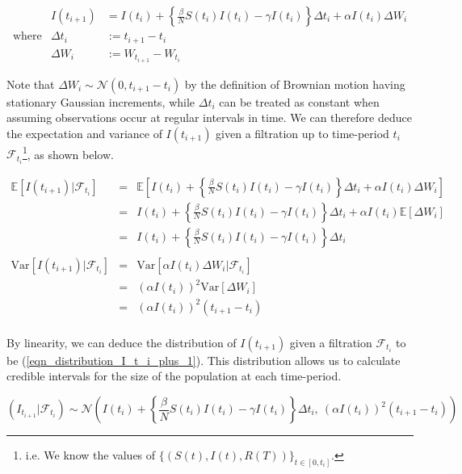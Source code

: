 \documentclass[11pt,a4paper]{article}
\newcommand*{\expect}{\mathbb{E}}
\newcommand*{\var}{\text{Var}}
\theoremstyle{break}
\begin{document}
  \begin{equation}\label{eqn_approximate_numerical_stochastic_I}
    \begin{array}{rrl}
      &I(t_{i+1})&=I(t_i)+\left\{\frac{\beta}N S(t_i)I(t_i)-\gamma I(t_i)\right\}\Delta t_i+\alpha I(t_i)\Delta W_i\\
      \text{where}&\Delta t_i&:=t_{i+1}-t_i\\
      &\Delta W_i&:=W_{t_{i+1}}-W_{t_i}
    \end{array}
  \end{equation}

  \par Note that $\Delta W_i\sim\mathcal{N}(0,t_{i+1}-t_i)$ by the definition of Brownian motion having stationary Gaussian increments, while $\Delta t_i$ can be treated as constant when assuming observations occur at regular intervals in time. We can therefore deduce the expectation and variance of $I(t_{i+1})$ given a filtration up to time-period $t_i$ $\mathcal{F}_{t_i}$\footnote{i.e. We know the values of $\{(S(t),I(t),R(T))\}_{t\in[0,t_i]}$.}, as shown below.

  \[\begin{array}{rcl}
    \expect\left[I(t_{i+1})|\mathcal{F}_{t_i}\right]&=&\expect\left[I(t_i)+\left\{\frac{\beta}N S(t_i)I(t_i)-\gamma I(t_i)\right\}\Delta t_i+\alpha I(t_i)\Delta W_i\right]\\
    &=&I(t_i)+\left\{\frac{\beta}N S(t_i)I(t_i)-\gamma I(t_i)\right\}\Delta t_i+\alpha I(t_i)\expect\left[\Delta W_i\right]\\
    &=&I(t_i)+\left\{\frac{\beta}N S(t_i)I(t_i)-\gamma I(t_i)\right\}\Delta t_i\\
    \\
    \var\left[I(t_{i+1})|\mathcal{F}_{t_i}\right]&=&\var\left[\alpha I(t_i)\Delta W_i|\mathcal{F}_{t_i}\right]\\
    &=&(\alpha I(t_i))^2\var[\Delta W_i]\\
    &=&(\alpha I(t_i))^2(t_{i+1}-t_i)\\
  \end{array}\]

  \par By linearity, we can deduce the distribution of $I(t_{i+1})$ given a filtration $\mathcal{F}_{t_i}$ to be (\ref{eqn_distribution_I_t_i_plus_1}). This distribution allows us to calculate credible intervals for the size of the population at each time-period.

  \begin{equation}\label{eqn_distribution_I_t_i_plus_1}
    (I_{t_{i+1}}|\mathcal{F}_{t_i})\sim\mathcal{N}\left(I(t_i)+\left\{\frac{\beta}N S(t_i)I(t_i)-\gamma I(t_i)\right\}\Delta t_i,\ (\alpha I(t_i))^2(t_{i+1}-t_i)\right)
  \end{equation}
\end{document}
